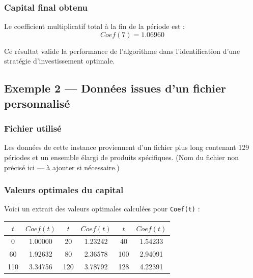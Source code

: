 \documentclass[a4paper,11pt]{article}
\begin{document}
\vspace{0.3cm}

\subsubsection{Capital final obtenu}

Le coefficient multiplicatif total à la fin de la période est :
\[
	\boxed{Coef(7) = 1.06960}
\]

Ce résultat valide la performance de l’algorithme dans l’identification d’une stratégie d’investissement optimale.


\subsection{Exemple 2 — Données issues d’un fichier personnalisé}

\subsubsection{Fichier utilisé}

Les données de cette instance proviennent d’un fichier plus long contenant 129 périodes et un ensemble élargi de produits spécifiques.  
(Nom du fichier non précisé ici — à ajouter si nécessaire.)

\vspace{0.3cm}

\subsubsection{Valeurs optimales du capital}

Voici un extrait des valeurs optimales calculées pour \texttt{Coef(t)} :

\begin{center}
	\begin{tabular}{|c|c||c|c||c|c|}
		\hline
		$t$ & $Coef(t)$ & $t$ & $Coef(t)$ & $t$ & $Coef(t)$ \\
		\hline
		0   & 1.00000   & 20  & 1.23242   & 40  & 1.54233   \\
		60  & 1.92632   & 80  & 2.36578   & 100 & 2.94091   \\
		110 & 3.34756   & 120 & 3.78792   & 128 & 4.22391   \\
		\hline
	\end{tabular}
\end{center}

\vspace{0.4cm}
\end{document}
